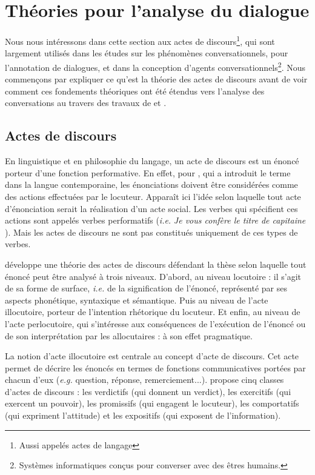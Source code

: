 \documentclass[10pt,a4paper,twoside]{article}
\begin{document}
\section{Théories pour l'analyse du dialogue}
\label{sec:dialog_analysis_theories}

Nous nous intéressons dans cette section aux actes de discours\footnote{Aussi appelés \og actes de langage \fg}, qui sont largement utilisés dans les études sur les phénomènes conversationnels, pour l'annotation de dialogues, et dans la conception d'agents conversationnels\footnote{Systèmes informatiques conçus pour converser avec des êtres humains.}. Nous commençons par expliquer ce qu'est la théorie des actes de discours avant de voir comment ces fondements théoriques ont été étendus vers l'analyse des conversations au travers des travaux de \citet{traum1992conversation} et \citet{poesio1997conversational}.

\subsection{Actes de discours}
\label{subsec:speech_acts}

En linguistique et en philosophie du langage, un acte de discours est un énoncé porteur d'une fonction performative. En effet, pour \citeauthor{austin1975how}, qui a introduit le terme dans la langue contemporaine, les énonciations doivent être considérées comme des actions effectuées par le locuteur. Apparaît ici l’idée selon laquelle tout acte d’énonciation serait la réalisation d’un acte social. Les verbes qui spécifient ces actions sont appelés verbes performatifs (\textit{i.e.} \textit{\og Je vous confère le titre de capitaine \fg}). Mais les actes de discours ne sont pas constitués uniquement de ces types de verbes. 

\citet{austin1975how} développe une théorie des actes de discours défendant la thèse selon laquelle tout énoncé peut être analysé à trois niveaux. D'abord, au niveau locutoire : il s'agit de sa forme de surface, \textit{i.e.} de la signification de l'énoncé, représenté par ses aspects phonétique, syntaxique et sémantique. Puis au niveau de l'acte illocutoire, porteur de l'intention rhétorique du locuteur. Et enfin, au niveau de l'acte perlocutoire, qui s'intéresse aux conséquences de l'exécution de l'énoncé ou de son interprétation par les allocutaires : à son effet pragmatique.

La notion d'acte illocutoire est centrale au concept d'acte de discours. Cet acte permet de décrire les énoncés en termes de fonctions communicatives portées par chacun d’eux (\textit{e.g.} question, réponse, remerciement...). \citeauthor{austin1975how} propose cinq classes d'actes de discours : les verdictifs (qui donnent un verdict), les exercitifs (qui exercent un pouvoir), les promissifs (qui engagent le locuteur), les comportatifs (qui expriment l'attitude) et les expositifs (qui exposent de l'information). 
\end{document}
